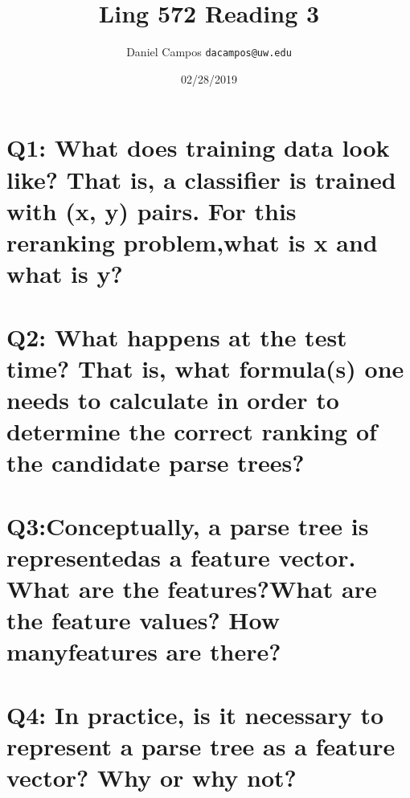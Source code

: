 \documentclass[11pt]{article}
\begin{document}
\title{Ling 572 Reading 3}
\author{Daniel Campos  \tt {dacampos@uw.edu}}
\date{02/28/2019}
\maketitle 
\section{ Q1: What does training data look like? That is, a classifier is trained with (x, y) pairs. For this reranking problem,what is x and what is y?   }

\section{ Q2: What happens at the test time? That is, what formula(s) one needs to calculate in order to determine the correct ranking of the candidate parse trees?}

\section{ Q3:Conceptually, a parse tree is representedas a feature vector. What are the features?What are the feature values? How manyfeatures are there?}

\section{Q4: In practice, is it necessary to represent a parse tree as a feature vector? Why or why not?}
\end{document}
